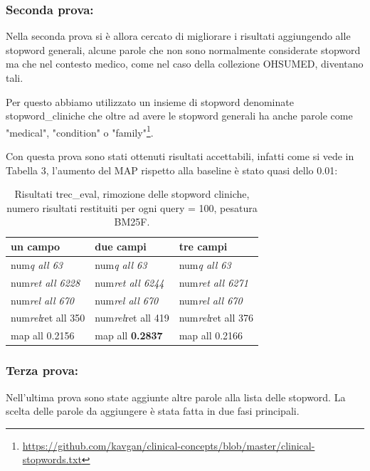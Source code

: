 \documentclass[runningheads]{llncs}
\begin{document}
\subsubsection{Seconda prova:}

Nella seconda prova si \`e allora cercato di migliorare i risultati aggiungendo alle stopword generali, alcune parole che non sono normalmente considerate stopword ma che nel contesto medico, come nel caso della collezione OHSUMED, diventano tali.

Per questo abbiamo utilizzato un insieme di stopword denominate stopword\_cliniche che oltre ad avere le stopword generali ha anche parole come "medical", "condition" o "family"\footnote{ \url{https://github.com/kavgan/clinical-concepts/blob/master/clinical-stopwords.txt}}.

Con questa prova sono stati ottenuti risultati accettabili, infatti come si vede in Tabella 3, l'aumento del MAP rispetto alla baseline \`e stato quasi dello 0.01:
\begin{table}
\centering
\begin{tabular}{lll}
\hline
\textbf{ un campo }           & \textbf{ due campi }           & \textbf{ tre campi }            \\ \hline
 num\textit{q all 63 }       &  num\textit{q all 63 }       &  num\textit{q all 63 }        \\
 num\textit{ret all 6228 }  &  num\textit{ret all 6244 }  &  num\textit{ret all 6271 }   \\
 num\textit{rel all 670 }    &  num\textit{rel all 670 }    &  num\textit{rel all 670 }     \\
 num\textit{rel}ret all 350  &  num\textit{rel}ret all 419  &  num\textit{rel}ret all 376   \\
map all 0.2156               & map all \bf 0.2837               & map all 0.2166          \\ \hline
\end{tabular}

\caption{ Risultati trec\_eval, rimozione delle stopword cliniche, numero risultati restituiti per ogni query = 100, pesatura BM25F.}
\end{table}


\subsubsection{Terza prova:}

Nell'ultima prova sono state aggiunte altre parole alla lista delle stopword. La scelta delle parole da aggiungere \`e stata fatta in due fasi principali.
\end{document}
